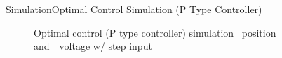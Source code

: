 \documentclass{beamer}
\begin{document}
\begin{frame}{Simulation}{Optimal Control Simulation (P Type Controller)}
    \begin{figure}
      \centering
      \caption{Optimal control (P type controller) simulation ~position and~~voltage w/ step input}
      \label{fig:LQR_Sim_Con}
    \end{figure}
\end{frame}
\end{document}
